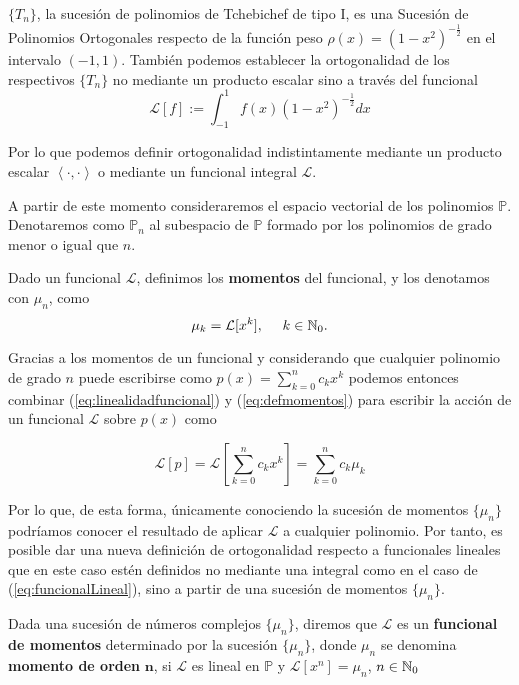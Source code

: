 \begin{ejemplo}
    $\{T_n\}$, la sucesión de polinomios de Tchebichef de tipo I, es una Sucesión de Polinomios Ortogonales respecto de la función peso $\rho(x)=(1-x^2)^{-\frac{1}{2}}$ en el intervalo $(-1,1)$. También podemos establecer la ortogonalidad de los respectivos $\{T_n\}$ no mediante un producto escalar sino a través del funcional
    $$
    \mathcal{L}[f]:= \int_{-1}^1 f(x)(1-x^2)^{-\frac{1}{2}}dx
    $$
\end{ejemplo}

Por lo que podemos definir ortogonalidad indistintamente mediante un producto escalar $\left\langle\cdot,\cdot\right\rangle$ o mediante un funcional integral $\mathcal{L}$.

A partir de este momento consideraremos el espacio vectorial de los polinomios $\mathbb{P}$. Denotaremos como $\mathbb{P}_n$ al subespacio de $\mathbb{P}$ formado por los polinomios de grado menor o igual que $n$.


\begin{definicion}
    Dado un funcional $\mathcal{L}$, definimos los \textbf{momentos} del funcional, y los denotamos con $\mu_n$, como
    \begin{equation}
        \label{eq:defmomentos}
        \mu_k = \mathcal{L}[x^k], \ \ \ \ k\in\mathbb{N}_0.
    \end{equation}    
\end{definicion}

Gracias a los momentos de un funcional y considerando que cualquier polinomio de grado $n$ puede escribirse como $p(x)=\sum_{k=0}^n c_k x^k$ podemos entonces combinar (\ref{eq:linealidadfuncional}) y (\ref{eq:defmomentos}) para  escribir la acción de un funcional $\mathcal{L}$ sobre $p(x)$ como

$$
\mathcal{L}[p] = \mathcal{L}\left[ \sum_{k=0}^n c_k x^k \right] = \sum_{k=0}^n c_k \mu_k
$$

Por lo que, de esta forma, únicamente conociendo la sucesión de momentos $\{\mu_n\}$ podríamos conocer el resultado de aplicar $\mathcal{L}$ a cualquier polinomio. Por tanto, es posible dar una nueva definición de ortogonalidad respecto a funcionales lineales que en este caso estén definidos no mediante una integral como en el caso de (\ref{eq:funcionalLineal}), sino a partir de una sucesión de momentos $\{\mu_n\}$.

\begin{definicion}
    Dada una sucesión de números complejos $\{\mu_n\}$, diremos que $\mathcal{L}$ es un \textbf{funcional de momentos} determinado por la sucesión $\{\mu_n\}$, donde $\mu_n$ se denomina \textbf{momento de orden }$\mathbf n$, si $\mathcal{L}$ es lineal en $\mathbb P$ y $\mathcal{L}[x^n]=\mu_n$, $n\in\mathbb{N}_0$
\end{definicion}

